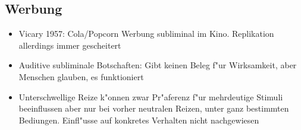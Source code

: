 \subsection{Werbung}
\begin{itemize}
	\item
		Vicary 1957: Cola/Popcorn Werbung subliminal im Kino. Replikation allerdings immer gescheitert
	\item
		Auditive subliminale Botschaften: Gibt keinen Beleg f"ur Wirksamkeit, aber Menschen glauben, es funktioniert
	\item
		Unterschwellige Reize k"onnen zwar Pr"aferenz f"ur mehrdeutige Stimuli beeinflussen aber nur bei vorher neutralen Reizen, unter ganz bestimmten Bediungen. Einfl"usse auf konkretes Verhalten nicht nachgewiesen
\end{itemize}
